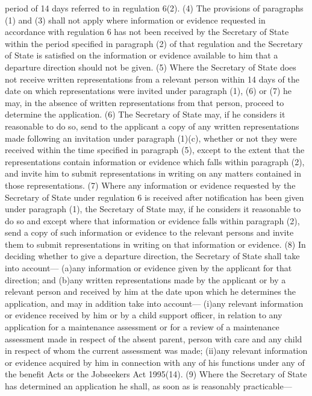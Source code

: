 \documentclass[a4paper]{article}
\begin{document}
period of 14 days referred to in regulation 6(2).
(4) The provisions of paragraphs (1) and (3) shall not apply where information
or evidence requested in accordance with regulation 6 has not been received by
the Secretary of State within the period specified in paragraph (2) of that
regulation and the Secretary of State is satisfied on the information or
evidence available to him that a departure direction should not be given.
(5) Where the Secretary of State does not receive written representations from a
relevant person within 14 days of the date on which representations were invited
under paragraph (1), (6) or (7) he may, in the absence of written
representations from that person, proceed to determine the application.
(6) The Secretary of State may, if he considers it reasonable to do so, send to
the applicant a copy of any written representations made following an invitation
under paragraph (1)(c), whether or not they were received within the time
specified in paragraph (5), except to the extent that the representations
contain information or evidence which falls within paragraph (2), and invite him
to submit representations in writing on any matters contained in those
representations.
(7) Where any information or evidence requested by the Secretary of State under
regulation 6 is received after notification has been given under paragraph (1),
the Secretary of State may, if he considers it reasonable to do so and except
where that information or evidence falls within paragraph (2), send a copy of
such information or evidence to the relevant persons and invite them to submit
representations in writing on that information or evidence.
(8) In deciding whether to give a departure direction, the Secretary of State
shall take into account—
(a)any information or evidence given by the applicant for that direction; and
(b)any written representations made by the applicant or by a relevant person and
received by him at the date upon which he determines the application, and may in
addition take into account—
(i)any relevant information or evidence received by him or by a child support
officer, in relation to any application for a maintenance assessment or for a
review of a maintenance assessment made in respect of the absent parent, person
with care and any child in respect of whom the current assessment was made;
(ii)any relevant information or evidence acquired by him in connection with any
of his functions under any of the benefit Acts or the Jobseekers Act 1995(14).
(9) Where the Secretary of State has determined an application he shall, as soon
as is reasonably practicable—
\end{document}
